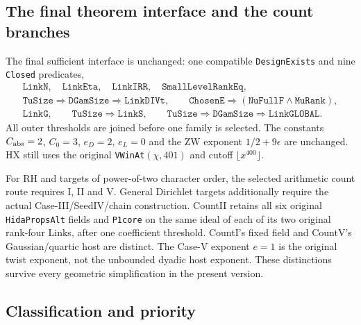 \subsection{The final theorem interface and the count branches}

The final sufficient interface is unchanged: one compatible
\texttt{DesignExists} and nine \texttt{Closed} predicates,
\[
\begin{gathered}
 \texttt{LinkN},\quad\texttt{LinkEta},\quad\texttt{LinkIRR},\quad
 \texttt{SmallLevelRankEq},\\
 \texttt{TuSize}\Rightarrow\texttt{DGamSize}\Rightarrow\texttt{LinkDIVt},
 \qquad\texttt{ChosenE}\Rightarrow
       (\texttt{NuFullF}\wedge\texttt{MuRank}),\\
 \texttt{LinkG},\qquad\texttt{TuSize}\Rightarrow\texttt{LinkS},\qquad
 \texttt{TuSize}\Rightarrow\texttt{DGamSize}\Rightarrow\texttt{LinkGLOBAL}.
                                                               \tag{AU32.10}
\end{gathered}
\]
All outer thresholds are joined before one family is selected.
The constants $C_{\rm abs}=2$, $C_0=3$, $e_D=2$, $e_L=0$
and the ZW exponent $1/2+9\epsilon$ are unchanged. HX still
uses the original \texttt{VWinAt}$(\chi,401)$ and cutoff
$\lfloor x^{400}\rfloor$.

For RH and targets of power-of-two character order, the selected
arithmetic count route requires I, II and V. General Dirichlet
targets additionally require the actual Case-III/SeedIV/chain
construction. CountII retains all six original \texttt{HidaPropsAlt}
fields and \texttt{P1core} on the same ideal of each of its two
original rank-four Links, after one coefficient threshold.
CountI's fixed field and CountV's Gaussian/quartic host are distinct.
The Case-V exponent $e=1$ is the original twist exponent, not the
unbounded dyadic host exponent. These distinctions survive every
geometric simplification in the present version.

\subsection{Classification and priority}

